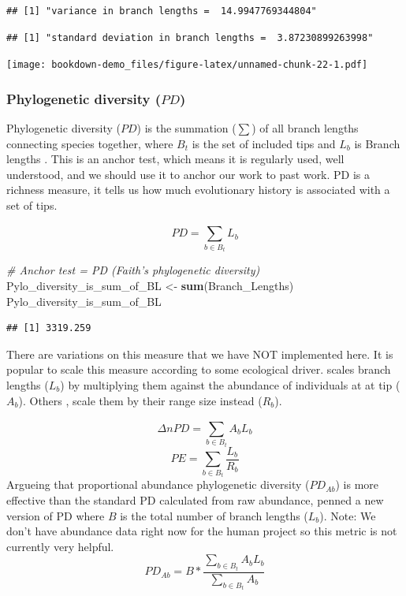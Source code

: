 \documentclass[]{book}
\newenvironment{Shaded}{\begin{snugshade}}{\end{snugshade}}
\newcommand{\KeywordTok}[1]{\textcolor[rgb]{0.13,0.29,0.53}{\textbf{{#1}}}}
\newcommand{\StringTok}[1]{\textcolor[rgb]{0.31,0.60,0.02}{{#1}}}
\newcommand{\CommentTok}[1]{\textcolor[rgb]{0.56,0.35,0.01}{\textit{{#1}}}}
\newcommand{\NormalTok}[1]{{#1}}
\theoremstyle{definition}
\theoremstyle{definition}
\theoremstyle{definition}
\theoremstyle{remark}
\begin{document}
\begin{verbatim}
## [1] "variance in branch lengths =  14.9947769344804"
\end{verbatim}

\begin{verbatim}
## [1] "standard deviation in branch lengths =  3.87230899263998"
\end{verbatim}

\texttt{[image: bookdown-demo\_files/figure-latex/unnamed-chunk-22-1.pdf]}

\subsubsection{\texorpdfstring{Phylogenetic diversity
(\(PD\))}{Phylogenetic diversity (PD)}}\label{phylogenetic-diversity-pd}

Phylogenetic diversity (\(PD\)) is the summation (\(\sum\)) of all
branch lengths connecting species together, where \(B_{t}\) is the set
of included tips and \(L_{b}\) is Branch lengths \citep{Faith1992}. This
is an anchor test, which means it is regularly used, well understood,
and we should use it to anchor our work to past work. PD is a richness
measure, it tells us how much evolutionary history is associated with a
set of tips.

\[PD = \sum_{b \in B_{t}}^{}L_{b}\]

\begin{Shaded}
\begin{Highlighting}[]
\CommentTok{# Anchor test = PD (Faith's phylogenetic diversity)}
\NormalTok{Pylo_diversity_is_sum_of_BL <-}\StringTok{ }\KeywordTok{sum}\NormalTok{(Branch_Lengths)}
\NormalTok{Pylo_diversity_is_sum_of_BL}
\end{Highlighting}
\end{Shaded}

\begin{verbatim}
## [1] 3319.259
\end{verbatim}

There are variations on this measure that we have NOT implemented here.
It is popular to scale this measure according to some ecological driver.
\citet{Barker2002} scales branch lengths (\(L_{b}\)) by multiplying them
against the abundance of individuals at at tip (\(A_{b}\)). Others
\citep{Rosauer2009}, scale them by their range size instead (\(R_{b}\)).

\[\Delta n PD = \sum_{b \in B_{t}}^{}A_{b}L_{b}\]
\[PE = \sum_{b \in B_{t}}^{}\dfrac{L_{b}}{R_{b}}\] Argueing that
proportional abundance phylogenetic diversity (\(PD_{Ab}\)) is more
effective than the standard PD calculated from raw abundance,
\citet{Vellend2011} penned a new version of PD where \(B\) is the total
number of branch lengths (\(L_{b}\)). Note: We don't have abundance data
right now for the human project so this metric is not currently very
helpful.\\
\[PD_{Ab} = B * \dfrac{\sum_{b \in B_{t}}^{}A_{b}L_{b}}{\sum_{b \in B_{t}}^{}A_{b}}\]
\end{document}
